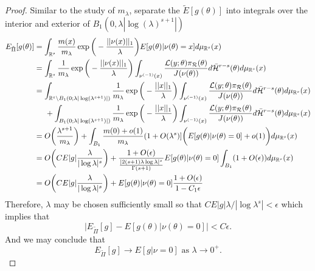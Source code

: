 \documentclass[10pt,fleqn]{article}
\DeclareMathOperator{\1}{\mathbbm{1}}
\begin{document}
{\begin{proof}
Similar to the study of $m_\lambda$, separate the $\tilde{E}[g(\theta)]$ into integrals over the interior and exterior of $B_1(0,\lambda|\log(\lambda)^{s+1}|)$
\begin{align*}
E_{\tilde{\Pi}}[g(\theta)] &= \int_{\mathbb{R}^s} \frac{m(x)}{m_\lambda}\exp\bigg(-\frac{||\nu(x)||_1}{\lambda}\bigg)E[g(\theta)|\nu(\theta)=x]d\mu_{\mathbb{R}^s}(x) \\
&= \int_{\mathbb{R}^s} \frac{1}{m_\lambda}\exp\bigg(-\frac{||\nu(x)||_1}{\lambda}\bigg)\int_{\nu^{(-1)}(x)} \frac{\mathcal{L}(y;\theta)\pi_\mathcal{R}(\theta)}{J(\nu(\theta))}d\bar{\mathcal{H}}^{r-s}(\theta) d\mu_{\mathbb{R}^s}(x) \\
&=\int_{\mathbb{R}^s \setminus B_1(0;\lambda|\log(\lambda^{s+1})|)} \frac{1}{m_\lambda}\exp\bigg(-\frac{||x||_1}{\lambda}\bigg) \int_{\nu^{(-1)}(x)} \frac{\mathcal{L}(y;\theta)\pi_\mathcal{R}(\theta)}{J(\nu(\theta))}d\bar{\mathcal{H}}^{r-s}(\theta) d\mu_{\mathbb{R}^s}(x) \\
&\hspace{0.5 cm} + \int_{B_1(0;\lambda|\log(\lambda^{s+1})|)} \frac{1}{m_\lambda}\exp\bigg(-\frac{||x||_1}{\lambda}\bigg) \int_{\nu^{(-1)}(x)} \frac{\mathcal{L}(y;\theta)\pi_\mathcal{R}(\theta)}{J(\nu(\theta))}d\bar{\mathcal{H}}^{r-s}(\theta)  d\mu_{\mathbb{R}^s}(x) \\
&= O\bigg( \frac{\lambda^{s+1}}{m_\lambda} \bigg) + \int_{B_1} \frac{m(0)+o(1)}{m_\lambda}(1+O(\lambda^s)]\bigg(E[g(\theta)|\nu(\theta)=0] + o(1) \bigg) d\mu_{\mathbb{R}^s}(x)  \\
&= O\bigg( C E|g|\frac{\lambda}{|\log\lambda|^s}\bigg) + \frac{1+O(\epsilon)}{ \frac{|2(s+1)\lambda \log \lambda |^s}{\Gamma(s+1)} } E[g(\theta)|\nu(\theta) = 0] \int_{B_1}(1+O(\epsilon))d\mu_{\mathbb{R}^s}(x) \\
&=O\bigg(C E|g|\frac{\lambda}{|\log\lambda|^s}\bigg)  +E[g(\theta)|\nu(\theta)=0] \frac{1+O(\epsilon)}{1-C_1\epsilon}
\end{align*}
Therefore, $\lambda$ may be chosen sufficiently small so that $CE|g|\lambda/|\log\lambda^s| < \epsilon $ which implies that 
$$\bigg|E_{\tilde{\Pi}}[g] - E[g(\theta)|\nu(\theta) = 0] \bigg| < C\epsilon.$$
And we may conclude that $$E_{\tilde{\Pi}}[g] \to E[g|\nu = 0] \text{ as } \lambda\to0^+.$$
\end{proof}
}



\end{document}
